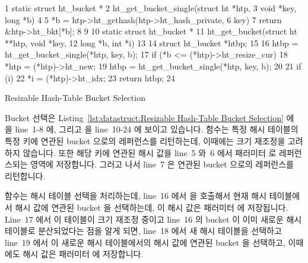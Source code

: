 \begin{listing}[tb]
{ \scriptsize
\begin{verbbox}
 1 static struct ht_bucket *
 2 ht_get_bucket_single(struct ht *htp,
 3                      void *key, long *b)
 4 {
 5   *b = htp->ht_gethash(htp->ht_hash_private,
 6                        key) %
 7   return &htp->ht_bkt[*b];
 8 }
 9 
10 static struct ht_bucket *
11 ht_get_bucket(struct ht **htp, void *key,
12               long *b, int *i)
13 {
14   struct ht_bucket *htbp;
15 
16   htbp = ht_get_bucket_single(*htp, key, b);
17   if (*b <= (*htp)->ht_resize_cur) {
18     *htp = (*htp)->ht_new;
19     htbp = ht_get_bucket_single(*htp, key, b);
20   }
21   if (i)
22     *i = (*htp)->ht_idx;
23   return htbp;
24 }
\end{verbbox}
}
\centering
\theverbbox
\caption{Resizable Hash-Table Bucket Selection}
\label{lst:datastruct:Resizable Hash-Table Bucket Selection}
\end{listing}

Bucket 선택은
Listing~\ref{lst:datastruct:Resizable Hash-Table Bucket Selection} 에
 을 line~1-8 에, 그리고
 을 line~10-24 에 보이고 있습니다.
 함수는 특정 해시 테이블의 특정 키에 연관된 bucket
으로의 레퍼런스를 리턴하는데, 이때에는 크기 재조정을 고려하지 않습니다.
또한 해당 키에 연관된 해시 값을 line~5 와~6 에서 패러미터  로
레퍼런스되는 영역에 저장합니다.
그러고 나서 line~7 은 연관된 bucket 으로의 레퍼런스를 리턴합니다.

 함수는 해시 테이블 선택을 처리하는데, line~16 에서
 을 호출해서 현재 해시 테이블에서 해시 값에 연관된
bucket 을 선택하는데, 이 해시 값은 패러미터  에 저장됩니다.
Line~17 에서 이 테이블이 크기 재조정 중이고 line~16 의 bucket 이 이미 새로운
해시 테이블로 분산되었다는 점을 알게 되면, line~18 에서 새 해시 테이블을
선택하고 line~19 에서 이 새로운 해시 테이블에서의 해시 값에 연관된 bucket 을
선택하고, 이때에도 해시 값은 패러미터  에 저장합니다.
\iffalse


